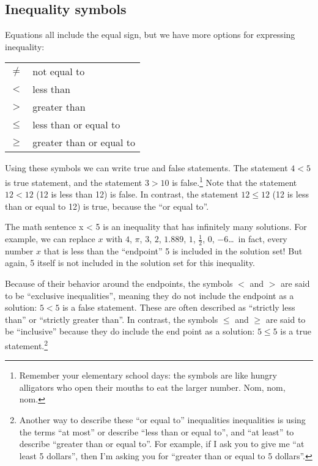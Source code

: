 \subsection{Inequality symbols}

Equations all include the equal sign, but we have more options for expressing inequality:

\begin{center}
\begin{tabular}{cl}
$\neq$	& not equal to\\
$<$	& less than\\
$>$	& greater than\\
$\leq$	& less than or equal to\\
$\geq$	& greater than or equal to
\end{tabular}
\end{center}

Using these symbols we can write true and false statements. The statement $4<5$ is true statement, and the statement $3>10$ is false.\footnote{Remember your elementary school days: the symbols are like hungry alligators who open their mouths to eat the larger number. Nom, nom, nom.} Note that the statement $12<12$ (12 is less than 12) is false. In contrast, the statement $12 \leq 12$ (12 is less than or equal to 12) is true, because the ``or equal to''.

The math sentence x < 5 is an inequality that has infinitely many solutions. For example, we can replace $x$ with $4$, $\pi$, $3$, $2$, $1.889$, $1$, $\frac{1}{2}$, $0$, $-6$\ldots\ in fact, every number $x$ that is less than the ``endpoint'' 5 is included in the solution set! But again, 5 itself is not included in the solution set for this inequality.

Because of their behavior around the endpoints, the symbols $<$ and $>$ are said to be ``exclusive inequalities'', meaning they do not include the endpoint as a solution: $5<5$ is a false statement. These are often described as ``strictly less than'' or ``strictly greater than''. In contrast, the symbols $\leq$ and $\geq$ are said to be ``inclusive'' because they do include the end point as a solution: $5 \leq 5$ is a true statement.\footnote{Another way to describe these ``or equal to'' inequalities inequalities is using the terms ``at most'' or describe ``less than or equal to'', and ``at least'' to describe ``greater than or equal to''. For example, if I ask you to give me ``at least 5 dollars'', then I'm asking you for ``greater than or equal to 5 dollars''.}

